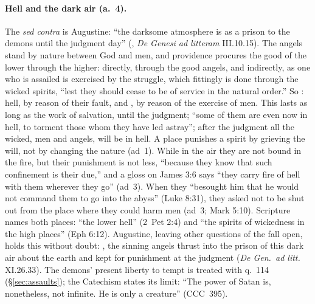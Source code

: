 \paragraph{Hell and the dark air (a.~4).} The \emph{sed contra} is
Augustine: ``the darksome atmosphere is as a prison to the demons until
the judgment day'' (,
\emph{De Genesi ad litteram} III.10.15). The angels
stand by nature between God and men, and providence procures the good
of the lower through the higher: directly, through the good angels, and
indirectly, as one who is assailed is exercised by the struggle, which
fittingly is done through the wicked spirits, ``lest they should cease
to be of service in the natural order.'' So : hell, by reason of their fault, and , by reason of the exercise of men. This lasts as long
as the work of salvation, until the judgment; ``some of them are even
now in hell, to torment those whom they have led astray''; after the
judgment all the wicked, men and angels, will be in hell. A place
punishes a spirit by grieving the will, not by changing the nature
(ad~1). While in the air they are not bound in the fire, but their
punishment is not less, ``because they know that such confinement is
their due,'' and a gloss on James 3:6 says ``they carry fire of hell
with them wherever they go'' (ad~3). When they ``besought him that he
would not command them to go into the abyss'' (Luke 8:31), they asked
not to be shut out from the place where they could harm men (ad~3; Mark
5:10). Scripture names both places: ``the lower hell'' (2~Pet 2:4) and
``the spirits of wickedness in the high places'' (Eph 6:12). Augustine,
leaving other questions of the fall open, holds this without doubt:
, the sinning angels thrust into the prison of
this dark air about the earth and kept for punishment at the judgment
(\emph{De Gen.\ ad litt.} XI.26.33). The demons' present liberty to
tempt is treated with q.~114 (\S\ref{sec:assaults}); the Catechism
states its limit: ``The power of Satan is, nonetheless, not
infinite. He is only a creature'' (CCC~395).

